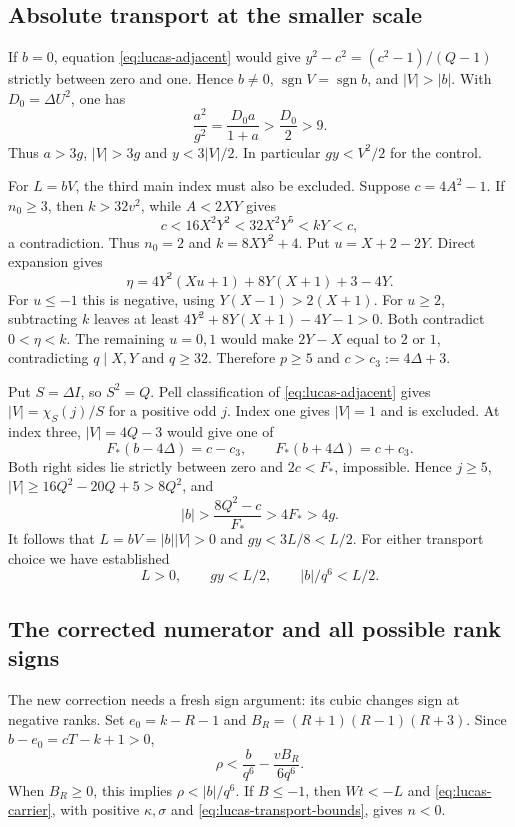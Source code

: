 \subsection{Absolute transport at the smaller scale}

If $b=0$, equation \eqref{eq:lucas-adjacent} would give
$y^2-c^2=(c^2-1)/(Q-1)$ strictly between zero and one.  Hence $b\ne0$,
$\operatorname{sgn}V=\operatorname{sgn}b$, and $|V|>|b|$.  With
$D_0=\Delta U^2$, one has
\[
 \frac{a^2}{g^2}=\frac{D_0a}{1+a}>\frac{D_0}{2}>9.
\]
Thus $a>3g$, $|V|>3g$ and $y<3|V|/2$.  In particular
$gy<V^2/2$ for the control.

For $L=bV$, the third main index must also be excluded.  Suppose
$c=4A^2-1$.  If $n_0\ge3$, then $k>32v^2$, while $A<2XY$ gives
\[
 c<16X^2Y^2<32X^2Y^5<kY<c,
\]
a contradiction.  Thus $n_0=2$ and $k=8XY^2+4$.  Put
$u=X+2-2Y$.  Direct expansion gives
\[
 \eta=4Y^2(Xu+1)+8Y(X+1)+3-4Y.
\]
For $u\le-1$ this is negative, using $Y(X-1)>2(X+1)$.  For $u\ge2$,
subtracting $k$ leaves at least $4Y^2+8Y(X+1)-4Y-1>0$.  Both contradict
$0<\eta<k$.  The remaining $u=0,1$ would make $2Y-X$ equal to $2$ or $1$,
contradicting $q\mid X,Y$ and $q\ge32$.  Therefore $p\ge5$ and
$c>c_3:=4\Delta+3$.

Put $S=\Delta I$, so $S^2=Q$.  Pell classification of
\eqref{eq:lucas-adjacent} gives $|V|=\chi_S(j)/S$ for a positive odd $j$.
Index one gives $|V|=1$ and is excluded.  At index three,
$|V|=4Q-3$ would give one of
\[
 F_*(b-4\Delta)=c-c_3,\qquad F_*(b+4\Delta)=c+c_3.
\]
Both right sides lie strictly between zero and $2c<F_*$, impossible.
Hence $j\ge5$, $|V|\ge16Q^2-20Q+5>8Q^2$, and
\[
 |b|>\frac{8Q^2-c}{F_*}>4F_*>4g.
\]
It follows that $L=bV=|b||V|>0$ and $gy<3L/8<L/2$.  For either transport
choice we have established
\begin{equation}
 L>0,\qquad gy<L/2,\qquad |b|/q^6<L/2.
 \label{eq:lucas-transport-bounds}
\end{equation}

\subsection{The corrected numerator and all possible rank signs}

The new correction needs a fresh sign argument: its cubic changes sign at
negative ranks.  Set $e_0=k-R-1$ and
$B_R=(R+1)(R-1)(R+3)$.  Since $b-e_0=cT-k+1>0$,
\[
 \rho<\frac b{q^6}-\frac{vB_R}{6q^6}.
\]
When $B_R\ge0$, this implies $\rho<|b|/q^6$.  If $B\le-1$, then
$Wt<-L$ and \eqref{eq:lucas-carrier}, with positive $\kappa,\sigma$ and
\eqref{eq:lucas-transport-bounds}, gives $n<0$.


